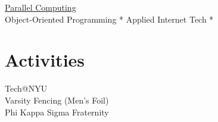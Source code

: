 \documentclass[]{hieudo-build}
\begin{document}
\begin{minipage}[t]{0.34\textwidth}
\href{https://github.com/JasonYao?utf8=\%E2\%9C\%93\&tab=repositories\&q=parallel\&type=\&language=}{Parallel Computing}\\
Object-Oriented Programming *
Applied Internet Tech *

\sectionsep

\section{Activities}
Tech@NYU\\
Varsity Fencing (Men's Foil)\\
Phi Kappa Sigma Fraternity
\sectionsep


\sectionsep
{}

\end{minipage} 
\hfill
\end{document}
